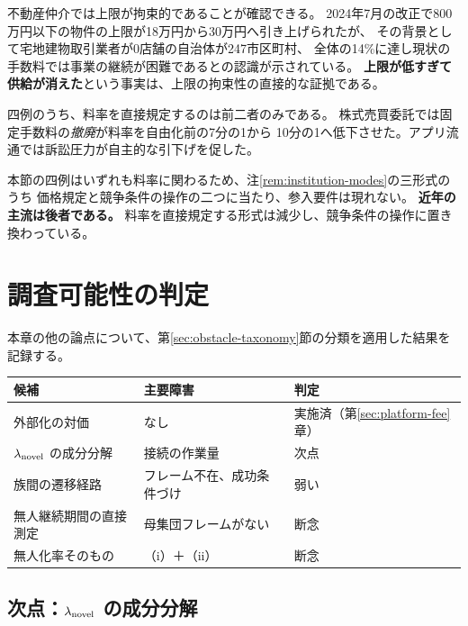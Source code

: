 不動産仲介では上限が拘束的であることが確認できる。
2024年7月の改正で800万円以下の物件の上限が18万円から30万円へ引き上げられたが、
その背景として宅地建物取引業者が0店舗の自治体が247市区町村、
全体の14\%に達し現状の手数料では事業の継続が困難であるとの認識が示されている。
\textbf{上限が低すぎて供給が消えた}という事実は、上限の拘束性の直接的な証拠である。

\begin{remark}[上限賦課から競争条件の操作へ]
\label{rem:institution-shift}
四例のうち、料率を直接規定するのは前二者のみである。
株式売買委託では固定手数料の\emph{撤廃}が料率を自由化前の7分の1から
10分の1へ低下させた。アプリ流通では訴訟圧力が自主的な引下げを促した。

本節の四例はいずれも料率に関わるため、注\ref{rem:institution-modes}の三形式のうち
価格規定と競争条件の操作の二つに当たり、参入要件は現れない。
\textbf{近年の主流は後者である。}
料率を直接規定する形式は減少し、競争条件の操作に置き換わっている。
\end{remark}

\section{調査可能性の判定}

本章の他の論点について、第\ref{sec:obstacle-taxonomy}節の分類を適用した結果を記録する。

\begin{center}
\begin{tabularx}{\textwidth}{@{}lXl@{}}
\toprule
候補 & 主要障害 & 判定 \\
\midrule
外部化の対価 & なし & 実施済（第\ref{sec:platform-fee}章） \\
$\lambda_{\rm novel}$ の成分分解 & 接続の作業量 & 次点 \\
族間の遷移経路 & フレーム不在、成功条件づけ & 弱い \\
無人継続期間の直接測定 & 母集団フレームがない & 断念 \\
無人化率そのもの & （i）＋（ii） & 断念 \\
\bottomrule
\end{tabularx}
\label{tab:platformfee-obstacle-assignment}
\end{center}

\subsection{次点：\texorpdfstring{$\lambda_{\rm novel}$}{lambda} の成分分解}


